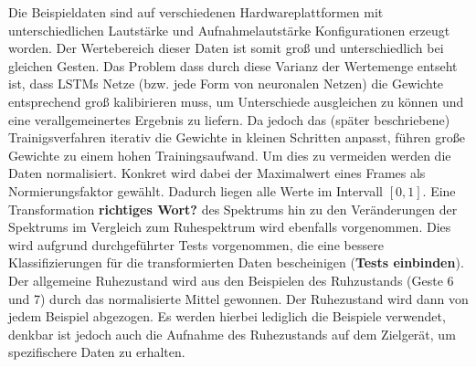 Die Beispieldaten sind auf verschiedenen Hardwareplattformen mit
unterschiedlichen Lautstärke und Aufnahmelautstärke Konfigurationen erzeugt
worden. Der Wertebereich dieser Daten ist somit groß und unterschiedlich bei
gleichen Gesten. Das Problem dass durch diese Varianz der Wertemenge entseht
ist, dass \acp{LSTM} Netze (bzw. jede Form von neuronalen Netzen) die Gewichte
entsprechend groß kalibirieren muss, um Unterschiede ausgleichen zu können und
eine verallgemeinertes Ergebnis zu liefern. Da jedoch das (später beschriebene)
Trainigsverfahren iterativ die Gewichte in kleinen Schritten anpasst, führen
große Gewichte zu einem hohen Trainingsaufwand. Um dies zu vermeiden werden die
Daten normalisiert. Konkret wird dabei der Maximalwert eines Frames als
Normierungsfaktor gewählt. Dadurch liegen alle Werte im Intervall $[0,1]$.
Eine Transformation \textbf{richtiges Wort?} des Spektrums hin zu den
Veränderungen der Spektrums im Vergleich zum Ruhespektrum wird ebenfalls
vorgenommen. Dies wird aufgrund durchgeführter Tests vorgenommen, die eine
bessere Klassifizierungen für die transformierten Daten bescheinigen
(\textbf{Tests einbinden}). Der allgemeine Ruhezustand wird aus den Beispielen
des Ruhzustands (Geste 6 und 7) durch das normalisierte Mittel gewonnen. Der
Ruhezustand wird dann von jedem Beispiel abgezogen. Es werden hierbei lediglich
die Beispiele verwendet, denkbar ist jedoch auch die Aufnahme des Ruhezustands
auf dem Zielgerät, um spezifischere Daten zu erhalten. 

